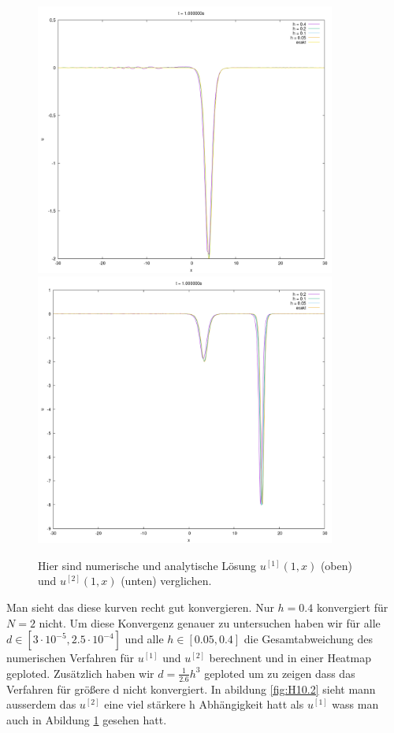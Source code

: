\documentclass[ngerman]{scrartcl}
\begin{document}
\begin{figure}[htbp]
	\centering
	\includegraphics[width=0.88\textwidth]{vergleichN1.png}
	\includegraphics[width=0.88\textwidth]{vergleichN2.png}
	\caption[Vergleich]{Hier sind numerische und analytische Lösung $u^{[1]}(1,x)$ (oben) und $u^{[2]}(1,x)$ (unten) verglichen.}
	\label{fig:H10.22}
\end{figure}
Man sieht das diese kurven recht gut konvergieren.
Nur $h=0.4$ konvergiert f\"ur $N=2$ nicht.
Um diese Konvergenz genauer zu untersuchen haben wir f\"ur alle
$d\in[3\cdot10^{-5},2.5\cdot10^{-4}]$
und alle $h\in[0.05,0.4]$
die Gesamtabweichung des numerischen Verfahren f\"ur $u^{[1]}$ und $u^{[2]}$
berechnent und in einer Heatmap geploted.
Zusätzlich haben wir $d=\frac{1}{2.6}h^3$ geploted um zu zeigen dass das
Verfahren f\"ur größere d nicht konvergiert.
In abildung \ref{fig:H10.2} sieht mann ausserdem das $u^{[2]}$ eine 
viel st\"arkere h Abh\"angigkeit hatt als $u^{[1]}$ wass man auch in Abildung \ref{fig:H10.22} gesehen hatt.
\end{document}
